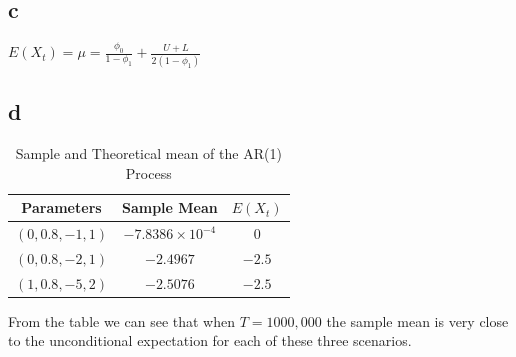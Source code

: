 \documentclass{report}
\begin{document}
\subsection*{c}

$E(X_t) = \mu = \frac{\phi_0}{1-\phi_1}+\frac{U+L}{2(1-\phi_1)}$

\subsection*{d}
 \begin{table}[H]
	\begin{center}
		\caption{Sample and Theoretical mean of the AR(1) Process}
		\label{tab:table8}
		\vspace{2mm}
		\begin{tabular}{c|c|c} 
			
			
			\textbf{Parameters} & \textbf{Sample Mean}&  \textbf{$E(X_t)$}\\
			\hline
			
			$(0,0.8,-1,1)$ &  $-7.8386\times 10^{-4}$& $0$    \\
			$(0,0.8,-2,1)$ &  $-2.4967$& $-2.5$  \\
			$(1,0.8,-5,2)$ &  $-2.5076$& $-2.5$  \\
		\end{tabular}
	\end{center}
\end{table}
From the table we can see that when  $T=1000,000$ the sample mean is very close to the unconditional expectation for each of these three scenarios.
\end{document}
